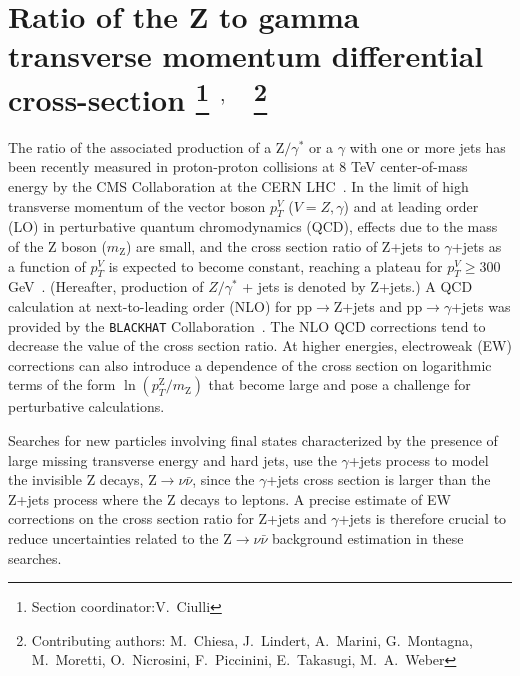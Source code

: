 \documentclass[11pt]{cernrep} \usepackage{graphicx,epsfig} 
\begin{document}
\section{Ratio of the Z to gamma transverse momentum differential cross-section \protect\footnote{Section
    coordinator:V.~Ciulli} $^{,}$ ~\protect\footnote{Contributing authors: M.~Chiesa, J.~Lindert, A.~Marini,  
    G.~Montagna, M.~Moretti, O.~Nicrosini, F.~Piccinini, E.~Takasugi, M.~A.~Weber }}

The ratio of the associated production of a $\mathrm{Z}/\gamma^*$ or a $\gamma$ with one or more jets has been recently measured in
proton-proton collisions at 8 TeV center-of-mass energy by the CMS Collaboration at the CERN
LHC~\cite{Khachatryan:2015ira}. In the limit of high transverse momentum of the vector boson $p_T^{V}$
($V=Z,\gamma$) and at leading order (LO) in perturbative quantum chromodynamics (QCD), effects due to the mass of the Z
boson ($m_\mathrm{Z}$) are small, and the 
cross section ratio of Z+jets to $\gamma$+jets as a function of $p_T^{V}$ is expected to become constant, reaching a
plateau for $p_T^{V} \geq 300$GeV~\cite{StirlingPaperZGamma}. (Hereafter, production of $Z/\gamma^*$ + jets is denoted by
Z+jets.) A QCD calculation at next-to-leading order (NLO) for pp$\to$Z+jets and pp$\to\gamma$+jets was provided by
the {\tt BLACKHAT} Collaboration~\cite{BlackHat}.  The NLO QCD corrections tend to decrease the value of
the cross section ratio. At higher energies, electroweak (EW) corrections 
can also introduce a dependence of the cross section on logarithmic terms of the form
$\ln(p_T^{\mathrm{Z}}/m_{\mathrm{Z}})$ that become large and pose a challenge for perturbative calculations.  

Searches for new particles involving final states characterized by the presence of large missing transverse
energy and hard jets, use the $\gamma$+jets process to model the invisible Z decays, Z$\to\nu\bar{\nu}$, since the
$\gamma$+jets cross section is larger than the Z+jets process where the Z decays to leptons. A precise estimate of EW
corrections on the cross section ratio for Z+jets and $\gamma$+jets is therefore crucial to reduce uncertainties related
to the Z$\to\nu\bar{\nu}$ background estimation in these searches. 
\end{document}
